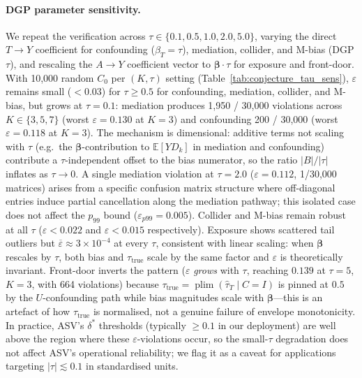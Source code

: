 \paragraph{DGP parameter sensitivity.}
We repeat the verification across $\tau \in \{0.1, 0.5, 1.0, 2.0, 5.0\}$, varying the direct $T{\to}Y$ coefficient for confounding ($\beta_T{=}\tau$), mediation, collider, and M-bias (DGP $\tau$), and rescaling the $A{\to}Y$ coefficient vector to $\boldsymbol{\beta}\cdot\tau$ for exposure and front-door. With 10{,}000 random $C_0$ per $(K,\tau)$ setting (Table~\ref{tab:conjecture_tau_sens}), $\varepsilon$ remains small ($< 0.03$) for $\tau \geq 0.5$ for confounding, mediation, collider, and M-bias, but grows at $\tau{=}0.1$: mediation produces 1{,}950 / 30{,}000 violations across $K \in \{3,5,7\}$ (worst $\varepsilon{=}0.130$ at $K{=}3$) and confounding 200 / 30{,}000 (worst $\varepsilon{=}0.118$ at $K{=}3$). The mechanism is dimensional: additive terms not scaling with $\tau$ (e.g.\ the $\boldsymbol{\beta}$-contribution to $\mathbb{E}[Y D_k]$ in mediation and confounding) contribute a $\tau$-independent offset to the bias numerator, so the ratio $|B|/|\tau|$ inflates as $\tau \to 0$. A single mediation violation at $\tau{=}2.0$ ($\varepsilon{=}0.112$, 1/30{,}000 matrices) arises from a specific confusion matrix structure where off-diagonal entries induce partial cancellation along the mediation pathway; this isolated case does not affect the $p_{99}$ bound ($\varepsilon_{p99}{=}0.005$). Collider and M-bias remain robust at all $\tau$ ($\varepsilon{<}0.022$ and $\varepsilon{<}0.015$ respectively). Exposure shows scattered tail outliers but $\overline{\varepsilon} \approx 3\!\times\!10^{-4}$ at every $\tau$, consistent with linear scaling: when $\boldsymbol{\beta}$ rescales by $\tau$, both bias and $\tau_{\text{true}}$ scale by the same factor and $\varepsilon$ is theoretically invariant. Front-door inverts the pattern ($\varepsilon$ \emph{grows} with $\tau$, reaching $0.139$ at $\tau{=}5$, $K{=}3$, with 664 violations) because $\tau_{\text{true}} = \operatorname{plim}(\hat{\tau}_T \mid C{=}I)$ is pinned at $0.5$ by the $U$-confounding path while bias magnitudes scale with $\boldsymbol{\beta}$---this is an artefact of how $\tau_{\text{true}}$ is normalised, not a genuine failure of envelope monotonicity. In practice, ASV's $\delta^*$ thresholds (typically $\geq 0.1$ in our deployment) are well above the region where these $\varepsilon$-violations occur, so the small-$\tau$ degradation does not affect ASV's operational reliability; we flag it as a caveat for applications targeting $|\tau| \lesssim 0.1$ in standardised units.

